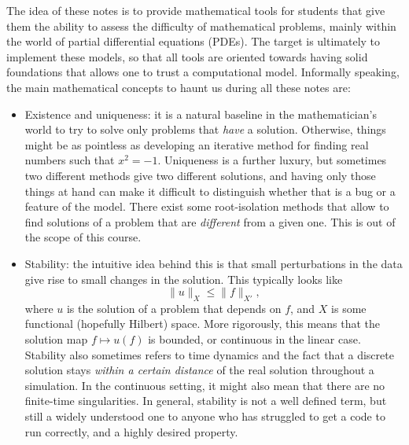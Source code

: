 The idea of these notes is to provide mathematical tools for students that give them the ability to assess the difficulty of mathematical problems, mainly within the world of partial differential equations (PDEs). The target is ultimately to implement these models, so that all tools are oriented towards having solid foundations that allows one to trust a computational model. Informally speaking, the main mathematical concepts to haunt us during all these notes are: 
\begin{itemize}
    \item Existence and uniqueness: it is a natural baseline in the mathematician's world to try to solve only problems that \emph{have} a solution. Otherwise, things might be as pointless as developing an iterative method for finding real numbers such that $x^2 = -1$. Uniqueness is a further luxury, but sometimes two different methods give two different solutions, and having only those things at hand can make it difficult to distinguish whether that is a bug or a feature of the model. There exist some root-isolation methods that allow to find solutions of a problem that are \emph{different} from a given one. This is out of the scope of this course. 
    \item Stability: the intuitive idea behind this is that small perturbations in the data give rise to small changes in the solution. This typically looks like 
    \begin{equation*}
        \| u\|_X \leq \| f\|_{X'},
    \end{equation*}
    where $u$ is the solution of a problem that depends on $f$, and $X$ is some functional (hopefully Hilbert) space. More rigorously, this means that the solution map $f \mapsto u(f)$ is bounded, or continuous in the linear case. Stability also sometimes refers to time dynamics and the fact that a discrete solution stays \emph{within a certain distance} of the real solution throughout a simulation. In the continuous setting, it might also mean that there are no finite-time singularities. In general, stability is not a well defined term, but still a widely understood one to anyone who has struggled to get a code to run correctly, and a highly desired property. 
\end{itemize}

